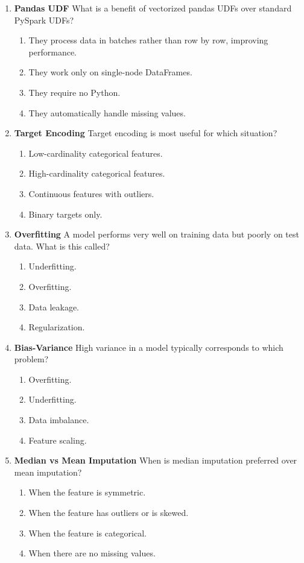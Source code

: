 \documentclass{article}
\begin{document}
\begin{enumerate}[label=\textbf{Q\arabic*.}]
		\item \textbf{Pandas UDF}
		What is a benefit of vectorized pandas UDFs over standard PySpark UDFs?
		\begin{enumerate}[label=\Alph*.]
			\item They process data in batches rather than row by row, improving performance.
			\item They work only on single-node DataFrames.
			\item They require no Python.
			\item They automatically handle missing values.
		\end{enumerate}
		
		\item \textbf{Target Encoding}
		Target encoding is most useful for which situation?
		\begin{enumerate}[label=\Alph*.]
			\item Low-cardinality categorical features.
			\item High-cardinality categorical features.
			\item Continuous features with outliers.
			\item Binary targets only.
		\end{enumerate}
		
		\item \textbf{Overfitting}
		A model performs very well on training data but poorly on test data. What is this called?
		\begin{enumerate}[label=\Alph*.]
			\item Underfitting.
			\item Overfitting.
			\item Data leakage.
			\item Regularization.
		\end{enumerate}
		
		\item \textbf{Bias-Variance}
		High variance in a model typically corresponds to which problem?
		\begin{enumerate}[label=\Alph*.]
			\item Overfitting.
			\item Underfitting.
			\item Data imbalance.
			\item Feature scaling.
		\end{enumerate}
		
		\item \textbf{Median vs Mean Imputation}
		When is median imputation preferred over mean imputation?
		\begin{enumerate}[label=\Alph*.]
			\item When the feature is symmetric.
			\item When the feature has outliers or is skewed.
			\item When the feature is categorical.
			\item When there are no missing values.
		\end{enumerate}
		

\end{enumerate}
\end{document}
